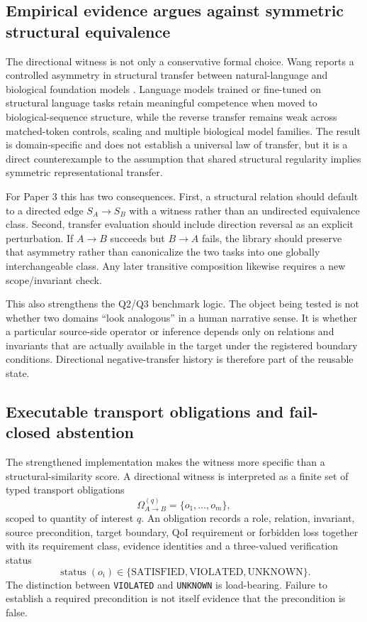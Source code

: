 \subsection{Empirical evidence argues against symmetric structural equivalence}

The directional witness is not only a conservative formal choice. Wang reports a controlled asymmetry in structural transfer between natural-language and biological foundation models \cite{wang2026asymmetry}. Language models trained or fine-tuned on structural language tasks retain meaningful competence when moved to biological-sequence structure, while the reverse transfer remains weak across matched-token controls, scaling and multiple biological model families. The result is domain-specific and does not establish a universal law of transfer, but it is a direct counterexample to the assumption that shared structural regularity implies symmetric representational transfer.

For Paper 3 this has two consequences. First, a structural relation should default to a directed edge $S_A\to S_B$ with a witness rather than an undirected equivalence class. Second, transfer evaluation should include direction reversal as an explicit perturbation. If $A\to B$ succeeds but $B\to A$ fails, the library should preserve that asymmetry rather than canonicalize the two tasks into one globally interchangeable class. Any later transitive composition likewise requires a new scope/invariant check.

This also strengthens the Q2/Q3 benchmark logic. The object being tested is not whether two domains ``look analogous'' in a human narrative sense. It is whether a particular source-side operator or inference depends only on relations and invariants that are actually available in the target under the registered boundary conditions. Directional negative-transfer history is therefore part of the reusable state.

\subsection{Executable transport obligations and fail-closed abstention}

The strengthened implementation makes the witness more specific than a structural-similarity score. A directional witness is interpreted as a finite set of typed transport obligations
\[
\Omega_{A\to B}^{(q)}=\{o_1,\ldots,o_m\},
\]
scoped to quantity of interest $q$. An obligation records a role, relation, invariant, source precondition, target boundary, QoI requirement or forbidden loss together with its requirement class, evidence identities and a three-valued verification status
\[
\operatorname{status}(o_i)\in\{\mathrm{SATISFIED},\mathrm{VIOLATED},\mathrm{UNKNOWN}\}.
\]
The distinction between \texttt{VIOLATED} and \texttt{UNKNOWN} is load-bearing. Failure to establish a required precondition is not itself evidence that the precondition is false.

